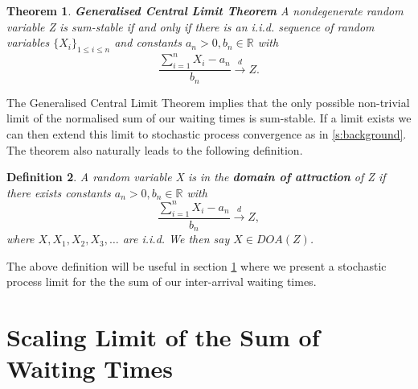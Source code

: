 \documentclass[honours,12pt]{UNSWthesis}
\newcommand{\R}{\mathbb{R}}
\newcommand{\1}{\mathbf 1}
\newtheorem{theorem}{Theorem}[section]
\newtheorem{definition}[theorem]{Definition}
\numberwithin{equation}{section}
\theoremstyle{definition}
\theoremstyle{remark}
\begin{document}
\begin{theorem}\cite{Nolan2015}%
\textbf{Generalised Central Limit Theorem} A nondegenerate random variable Z is sum-stable if and only if there is an i.i.d. sequence of random variables $\{X_i\}_{1\leq i \leq n}$  and constants $a_n>0, b_n \in \R$ with 
\[
	\frac{\sum^n_{i=1}X_i-a_n}{b_n} \overset{d}{\longrightarrow}Z.
\]
\end{theorem}

\noindent The Generalised Central Limit Theorem implies that the only possible non-trivial limit of the normalised sum of our waiting times is sum-stable. If a limit exists we can then extend this limit to stochastic process convergence as in \ref{s:background}. The theorem also naturally leads to the following definition.\\

\begin{definition}\cite{Nolan2015}\label{def:DOA}
	A random variable X is in the \textbf{domain of attraction} of Z if there exists constants $a_n>0,b_n\in\R$ with
	\[
		\frac{\sum^n_{i=1}X_i-a_n}{b_n} \overset{d}{\longrightarrow}Z,
	\]
	where $X, X_1, X_2, X_3, \ldots$ are i.i.d. We then say $X\in DOA(Z)$.\\
\end{definition}

\noindent The above definition will be useful in section \ref{s:waitingTimes} where we present a stochastic process limit for the the sum of our inter-arrival waiting times.\\

\section{Scaling Limit of the Sum of Waiting Times}\label{s:waitingTimes}
\end{document}
